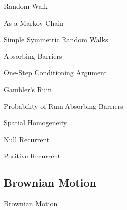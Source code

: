 \documentclass[11pt,a4paper]{article}
\begin{document}
\begin{definition}{Random Walk}

\end{definition}

\begin{remark}{As a Markov Chain}

\end{remark}

\begin{definition}{Simple Symmetric Random Walks}

\end{definition}

\begin{definition}{Absorbing Barriers}

\end{definition}

\begin{theorem}{One-Step Conditioning Argument}

\end{theorem}

\begin{definition}{Gambler's Ruin}

\end{definition}

\begin{theorem}{Probability of Ruin \w Absorbing Barriers}

\end{theorem}

\begin{definition}{Spatial Homogeneity}

\end{definition}

\begin{definition}{Null Recurrent}

\end{definition}

\begin{definition}{Positive Recurrent}

\end{definition}

\subsection{Brownian Motion}

\begin{definition}{Brownian Motion}
\end{definition}
\end{document}
